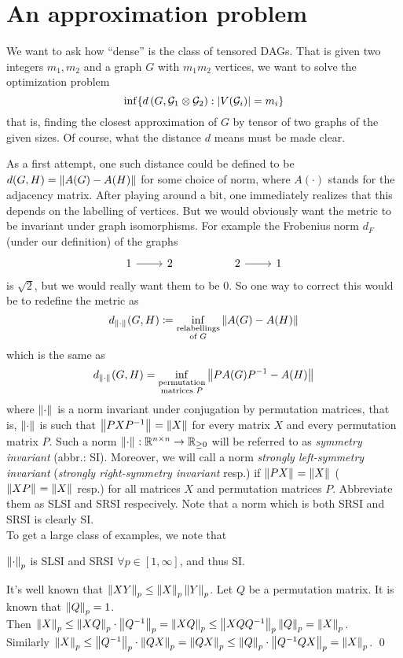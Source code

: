 \section{An approximation problem}

We want to ask how ``dense'' is the class of tensored DAGs. That is given two integers $m_1,m_2$ and a graph $G$ with $m_1m_2$ vertices, we want to solve the optimization problem $$\inf \{d\left(G, {\mathcal{G}}_1\otimes {\mathcal{G}}_2\right): \left| V({\mathcal{G}}_i) \right| = m_i\}$$
that is, finding the closest approximation of $G$ by tensor of two graphs of the given sizes. Of course, what the distance $d$ means must be made clear. 

As a first attempt, one such distance could be defined to be $d(G,H) = \left\lVert A(G)-A(H) \right\rVert_{}$ for some choice of norm, where $A(\cdot)$ stands for the adjacency matrix. After playing around a bit, one immediately realizes that this depends on the labelling of vertices. But we would obviously want the metric to be invariant under graph isomorphisms. For example the Frobenius norm $d_F$ (under our definition) of the graphs \[\begin{tikzcd}
	1 & 2 && 2 & 1
	\arrow[from=1-4, to=1-5]
	\arrow[from=1-1, to=1-2]
\end{tikzcd}\]
is $\sqrt 2$, but we would really want them to be $0$. So one way to correct this would be to redefine the metric as $$d_{\left\lVert \cdot \right\rVert_{}}(G,H) \coloneqq \inf_{\substack{\text{relabellings}\\\text{of }G}}\left\lVert A(G)-A(H) \right\rVert_{}$$ which is the same as $$d_{\left\lVert \cdot \right\rVert_{}}(G,H) = \inf_{\substack{\text{permutation}\\\text{matrices }P}}\left\lVert PA(G)P^{-1}-A(H) \right\rVert_{}$$ where $\left\lVert \cdot \right\rVert_{}$ is a norm invariant under conjugation by permutation matrices, that is, $\left\lVert \cdot \right\rVert_{}$ is such that $\left\lVert PXP^{-1} \right\rVert_{} = \left\lVert X \right\rVert_{}$ for every matrix $X$ and every permutation matrix $P$. Such a norm $\left\lVert \cdot \right\rVert_{}:\mathbb{R}^{n\times n}\to \mathbb{R}_{\geq 0}$ will be referred to as \textit{symmetry invariant} (abbr.: SI). Moreover, we will call a norm \textit{strongly left-symmetry invariant} (\textit{strongly right-symmetry invariant} resp.) if $\left\lVert PX \right\rVert_{} = \left\lVert X \right\rVert_{}$ ($\left\lVert XP \right\rVert_{} = \left\lVert X \right\rVert_{}$ resp.) for all matrices $X$ and permutation matrices $P$. Abbreviate them as SLSI and SRSI respecively.
Note that a norm which is both SRSI and SRSI is clearly SI.\\
To get a large class of examples, we note that
\begin{prop}
$\left\lVert \cdot \right\rVert_{p}$ is SLSI and SRSI $\forall p\in [1,\infty]$, and thus SI.
\end{prop}
\begin{pf}
It's well known that $\left\lVert XY \right\rVert_{p} \leq \left\lVert X \right\rVert_{p}\left\lVert Y \right\rVert_{p}$. Let $Q$ be a permutation matrix. It is known that $\left\lVert Q \right\rVert_{p} = 1$.\\ 
Then $\left\lVert X \right\rVert_{p} \leq \left\lVert XQ \right\rVert_{p}\cdot\left\lVert Q^{-1} \right\rVert_{p} = \left\lVert XQ \right\rVert_{p} \leq \left\lVert XQQ^{-1} \right\rVert_{p} \left\lVert Q \right\rVert_{p} = \left\lVert X \right\rVert_{p}$. \\
Similarly $\left\lVert X \right\rVert_{p} \leq \left\lVert Q^{-1} \right\rVert_{p}\cdot \left\lVert QX \right\rVert_{p} = \left\lVert QX \right\rVert_{p} \leq \left\lVert Q \right\rVert_{p}\cdot \left\lVert Q^{-1}QX \right\rVert_{p}  = \left\lVert X \right\rVert_{p}$.
\hfill\qed\end{pf}

